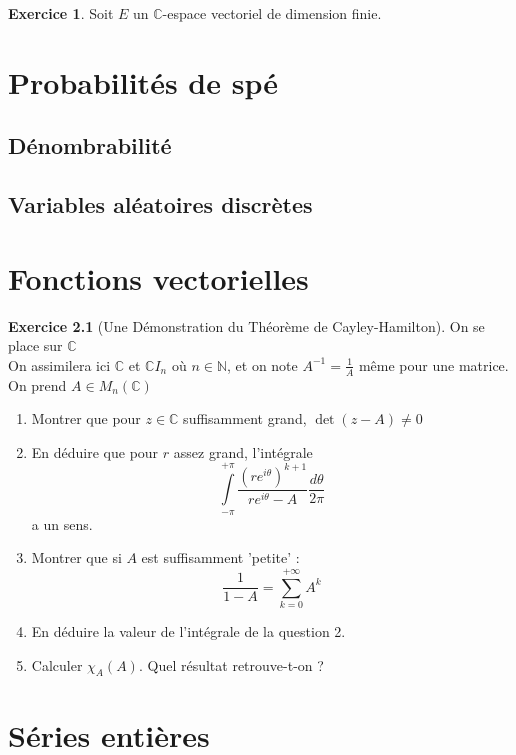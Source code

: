 \documentclass[12pt,a4paper]{book}
\theoremstyle{definition}
\newtheorem{exo}{Exercice}[section]
\theoremstyle{remark}
\newcommand{\C}{\mathbb{C}}
\begin{document}
\begin{exo}
    Soit $E$ un $\C$-espace vectoriel de dimension finie.
\end{exo}


\chapter{Probabilités de spé}

\section{Dénombrabilité}

\section{Variables aléatoires discrètes}


\chapter{Fonctions vectorielles}

\begin{exo}[Une Démonstration du Théorème de Cayley-Hamilton]
    On se place sur $\C$\\
    On assimilera ici $\mathbb{C}$ et $\mathbb{C}I_{n}$ où $n \in \mathbb{N}$, et on note $A^{-1} = \frac{1}{A}$ même pour une matrice.\\
    On prend $A \in M_{n}(\mathbb{C})$
    \begin{enumerate}
        \item Montrer que pour $z \in \mathbb{C}$ suffisamment grand, $\det(z - A) \neq 0 $
        \item En déduire que pour $r$ assez grand, l'intégrale \[\int\limits_{-\pi}^{+\pi}\frac{(re^{i\theta})^{k+1}}{re^{i\theta} - A}\frac{d\theta}{2\pi}\] a un sens. 
        \item Montrer que si $A$ est suffisamment 'petite' : \[\frac{1}{1-A} = \sum_{k=0}^{+\infty} A^{k} \]
        \item En déduire la valeur de l'intégrale de la question 2.
        \item Calculer $\chi_{A}(A)$. Quel résultat retrouve-t-on ?
    \end{enumerate}
\end{exo}


\chapter{Séries entières}
\end{document}
